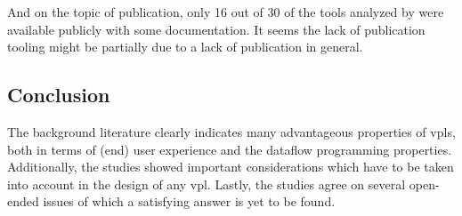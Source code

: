 





And on the topic of publication, only 16 out of 30 of the tools analyzed by \citet{kuhail_characterizing_2021} were available publicly with some documentation.
It seems the lack of publication tooling might be partially due to a lack of publication in general. 

\subsection{Conclusion}

The background literature clearly indicates many advantageous properties of vpls, both in terms of (end) user experience and the dataflow programming properties. 
Additionally, the studies showed important considerations which have to be taken into account in the design of any vpl.  
Lastly, the studies agree on several open-ended issues of which a satisfying answer is yet to be found. 

